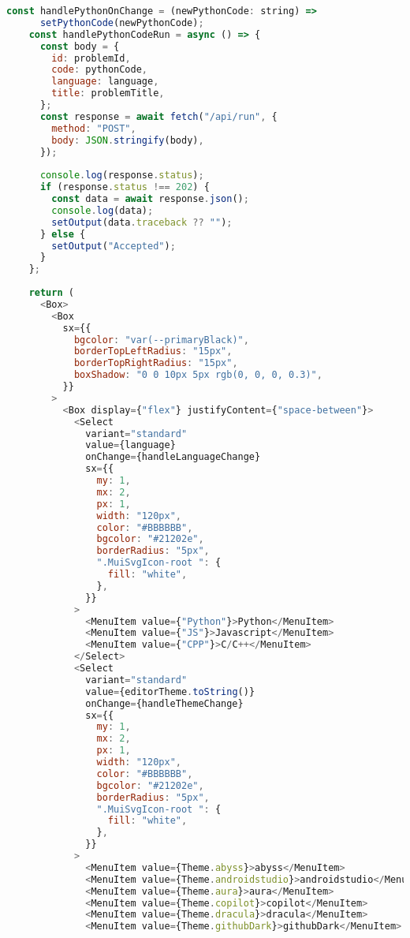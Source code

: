 \begin{lstlisting}[language=JavaScript, frame=single, caption={Codemirror буюу @uiw/react-codemirror-ийн компонентийг ашиглаж буй байдал}]
    const handlePythonOnChange = (newPythonCode: string) =>
      setPythonCode(newPythonCode);
    const handlePythonCodeRun = async () => {
      const body = {
        id: problemId,
        code: pythonCode,
        language: language,
        title: problemTitle,
      };
      const response = await fetch("/api/run", {
        method: "POST",
        body: JSON.stringify(body),
      });
  
      console.log(response.status);
      if (response.status !== 202) {
        const data = await response.json();
        console.log(data);
        setOutput(data.traceback ?? "");
      } else {
        setOutput("Accepted");
      }
    };
  
    return (
      <Box>
        <Box
          sx={{
            bgcolor: "var(--primaryBlack)",
            borderTopLeftRadius: "15px",
            borderTopRightRadius: "15px",
            boxShadow: "0 0 10px 5px rgb(0, 0, 0, 0.3)",
          }}
        >
          <Box display={"flex"} justifyContent={"space-between"}>
            <Select
              variant="standard"
              value={language}
              onChange={handleLanguageChange}
              sx={{
                my: 1,
                mx: 2,
                px: 1,
                width: "120px",
                color: "#BBBBBB",
                bgcolor: "#21202e",
                borderRadius: "5px",
                ".MuiSvgIcon-root ": {
                  fill: "white",
                },
              }}
            >
              <MenuItem value={"Python"}>Python</MenuItem>
              <MenuItem value={"JS"}>Javascript</MenuItem>
              <MenuItem value={"CPP"}>C/C++</MenuItem>
            </Select>
            <Select
              variant="standard"
              value={editorTheme.toString()}
              onChange={handleThemeChange}
              sx={{
                my: 1,
                mx: 2,
                px: 1,
                width: "120px",
                color: "#BBBBBB",
                bgcolor: "#21202e",
                borderRadius: "5px",
                ".MuiSvgIcon-root ": {
                  fill: "white",
                },
              }}
            >
              <MenuItem value={Theme.abyss}>abyss</MenuItem>
              <MenuItem value={Theme.androidstudio}>androidstudio</MenuItem>
              <MenuItem value={Theme.aura}>aura</MenuItem>
              <MenuItem value={Theme.copilot}>copilot</MenuItem>
              <MenuItem value={Theme.dracula}>dracula</MenuItem>
              <MenuItem value={Theme.githubDark}>githubDark</MenuItem>

\end{lstlisting}
